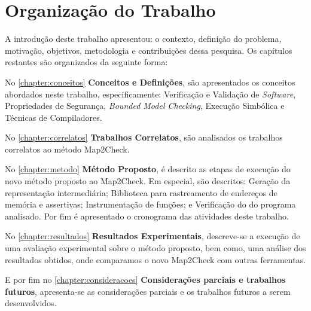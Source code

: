 \section{Organização do Trabalho}
A introdução deste trabalho apresentou: o contexto, definição do problema, motivação, objetivos, metodologia e contribuições dessa pesquisa. Os capítulos restantes são organizados da seguinte forma:
\par
No \autoref{chapter:conceitos} \textbf{Conceitos e Definições}, são apresentados os conceitos abordados neste trabalho, especificamente: Verificação e Validação de \textit{Software}, Propriedades de Segurança, \textit{Bounded Model Checking}, Execução Simbólica e Técnicas de Compiladores.
\par
No \autoref{chapter:correlatos} \textbf{Trabalhos Correlatos}, são analisados os trabalhos correlatos ao método Map2Check.
\par
No \autoref{chapter:metodo} \textbf{Método Proposto}, é descrito as etapas de execução do novo método proposto ao Map2Check.
Em especial, são descritos: Geração da representação intermediária; Biblioteca para rastreamento de endereços de memória e assertivas; Instrumentação de funções; e Verificação do  do programa analisado. Por fim é apresentado o cronograma das atividades deste trabalho.
\par
No \autoref{chapter:resultados} \textbf{Resultados Experimentais}, descreve-se a execução de uma avaliação experimental sobre o método proposto, bem como, 
uma análise dos resultados obtidos, onde comparamos o novo Map2Check com outras ferramentas. 
\par
E por fim no \autoref{chapter:consideracoes} \textbf{Considerações parciais e trabalhos futuros}, apresenta-se as considerações parciais e os trabalhos futuros a serem desenvolvidos. 

